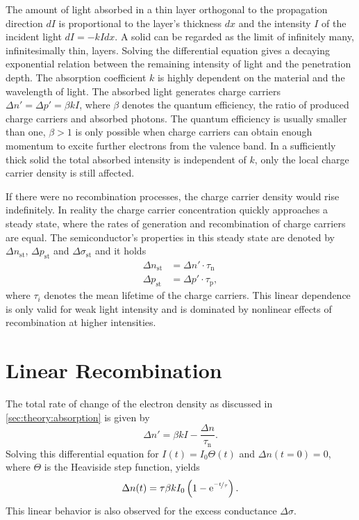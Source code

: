 The amount of light absorbed in a thin layer orthogonal to the propagation direction $dI$ is proportional to the layer's thickness $dx$ and the intensity $I$ of the incident light $dI = - k I dx$.
A solid can be regarded as the limit of infinitely many, infinitesimally thin, layers.
Solving the differential equation gives a decaying exponential relation between the remaining intensity of light and the penetration depth.
The absorption coefficient $k$ is highly dependent on the material and the wavelength of light.
The absorbed light generates charge carriers $\Delta n' = \Delta p' = \beta k I$, where $\beta$ denotes the quantum efficiency, the ratio of produced charge carriers and absorbed photons.
The quantum efficiency is usually smaller than one, $\beta > 1$ is only possible when charge carriers can obtain enough momentum to excite further electrons from the valence band.
In a sufficiently thick solid the total absorbed intensity is independent of $k$, only the local charge carrier density is still affected.

If there were no recombination processes, the charge carrier density would rise indefinitely.
In reality the charge carrier concentration quickly approaches a steady state, where the rates of generation and recombination of charge carriers are equal.
The semiconductor's properties in this steady state are denoted by $\Delta n_\text{st}$, $\Delta p_\text{st}$ and $\Delta \sigma_\text{st}$ and it holds
\begin{align*}
	\Delta n_\text{st} &= \Delta n' \cdot \tau_\text{n} \\
	\Delta p_\text{st} &= \Delta p' \cdot \tau_\text{p},
\end{align*}
where $\tau_i$ denotes the mean lifetime of the charge carriers.
This linear dependence is only valid for weak light intensity and is dominated by nonlinear effects of recombination at higher intensities.

\section{Linear Recombination}
The total rate of change of the electron density as discussed in \autoref{sec:theory:absorption} is given by
\begin{equation*}
	\Delta n' = \beta k I - \frac{\Delta n}{\tau_\text{n}}.
\end{equation*}
Solving this differential equation for $I(t) = I_0 \Theta (t)$ and $\Delta n (t = 0) = 0$, where $\Theta$ is the Heaviside step function, yields
\begin{equation}
	\Delta n (t) = \tau \beta k I_0 \left(1 - \mathrm{e}^{\nicefrac{-t}{\tau}}\right).
\end{equation}
This linear behavior is also observed for the excess conductance $\Delta \sigma$.

